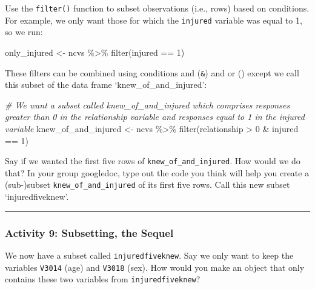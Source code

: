 \documentclass[
]{book}
\newenvironment{Shaded}{\begin{snugshade}}{\end{snugshade}}
\newcommand{\CommentTok}[1]{\textcolor[rgb]{0.56,0.35,0.01}{\textit{#1}}}
\newcommand{\DecValTok}[1]{\textcolor[rgb]{0.00,0.00,0.81}{#1}}
\newcommand{\FunctionTok}[1]{\textcolor[rgb]{0.00,0.00,0.00}{#1}}
\newcommand{\NormalTok}[1]{#1}
\newcommand{\OtherTok}[1]{\textcolor[rgb]{0.56,0.35,0.01}{#1}}
\newcommand{\SpecialCharTok}[1]{\textcolor[rgb]{0.00,0.00,0.00}{#1}}
\begin{document}
Use the \texttt{filter()} function to subset observations (i.e., rows) based on conditions. For example, we only want those for which the \texttt{injured} variable was equal to 1, so we run:

\begin{Shaded}
\begin{Highlighting}[]
\NormalTok{only\_injured }\OtherTok{\textless{}{-}}\NormalTok{ ncvs }\SpecialCharTok{\%\textgreater{}\%} \FunctionTok{filter}\NormalTok{(injured }\SpecialCharTok{==} \DecValTok{1}\NormalTok{)}
\end{Highlighting}
\end{Shaded}

These filters can be combined using conditions and (\texttt{\&}) and or (\texttt{\textbar{}}) except we call this subset of the data frame `knew\_of\_and\_injured':

\begin{Shaded}
\begin{Highlighting}[]
\CommentTok{\# We want a subset called \textquotesingle{}knew\_of\_and\_injured\textquotesingle{} which comprises responses greater than 0 in the \textquotesingle{}relationship\textquotesingle{} variable and responses equal to 1 in the \textquotesingle{}injured\textquotesingle{} variable}
\NormalTok{knew\_of\_and\_injured }\OtherTok{\textless{}{-}}\NormalTok{ ncvs }\SpecialCharTok{\%\textgreater{}\%} 
\FunctionTok{filter}\NormalTok{(relationship }\SpecialCharTok{\textgreater{}} \DecValTok{0} \SpecialCharTok{\&}\NormalTok{ injured }\SpecialCharTok{==} \DecValTok{1}\NormalTok{)}
\end{Highlighting}
\end{Shaded}

Say if we wanted the first five rows of \texttt{knew\_of\_and\_injured}. How would we do that? In your group googledoc, type out the code you think will help you create a (sub-)subset \texttt{knew\_of\_and\_injured} of its first five rows. Call this new subset `injuredfiveknew'.

\begin{center}\rule{0.5\linewidth}{0.5pt}\end{center}

\hypertarget{activity-9-subsetting-the-sequel}{%
\subsubsection{Activity 9: Subsetting, the Sequel}\label{activity-9-subsetting-the-sequel}}

We now have a subset called \texttt{injuredfiveknew}. Say we only want to keep the variables \texttt{V3014} (age) and \texttt{V3018} (sex). How would you make an object that only contains these two variables from \texttt{injuredfiveknew}?
\end{document}
